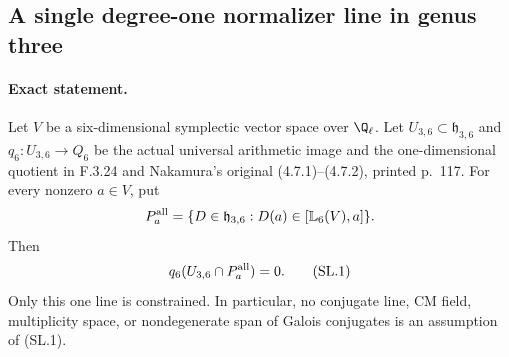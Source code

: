 \subsection*{A single degree-one normalizer line in genus three}

\paragraph{Exact statement.}
Let $V$ be a six-dimensional symplectic vector space over $\Q_\ell$.
Let $U_{3,6}\subset\mathfrak h_{3,6}$ and
$q_6:U_{3,6}\to Q_6$ be the actual universal arithmetic image and
the one-dimensional quotient in F.3.24 and Nakamura's original
(4.7.1)--(4.7.2), printed p.~117.
For every nonzero $a\in V$, put
\[
 P_a^{\rm all}=\{D\in\mathfrak h_{3,6}:
                         D(a)\in[\mathbb L_6(V),a]\}.
\]
Then
\[
                    q_6(U_{3,6}\cap P_a^{\rm all})=0.       \tag{SL.1}
\]
Only this one line is constrained. In particular, no conjugate line,
CM field, multiplicity space, or nondegenerate span of Galois conjugates
is an assumption of (SL.1).

